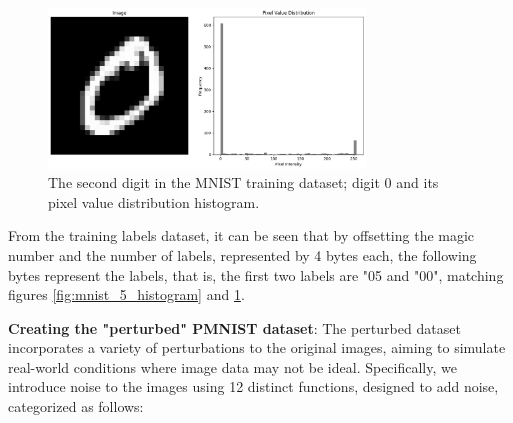\begin{figure}[h]
    \centering
    \includegraphics[width=0.75\textwidth]{Figures/Methods/MNIST_0_with_histogram.png}
    \caption{The second digit in the MNIST training dataset; digit 0 and its pixel value distribution histogram.}
    \label{fig:mnist_0_histogram}
\end{figure}

From the training labels dataset, it can be seen that by offsetting the magic number and the number of labels, represented by 4 bytes each, the following bytes represent the labels, that is, the first two labels are "05 and "00", matching figures \ref{fig:mnist_5_histogram} and \ref{fig:mnist_0_histogram}.


\textbf{Creating the "perturbed" PMNIST dataset}: The perturbed dataset incorporates a variety of perturbations to the original images, aiming to simulate real-world conditions where image data may not be ideal. Specifically, we introduce noise to the images using 12 distinct functions, designed to add noise, categorized as follows:

